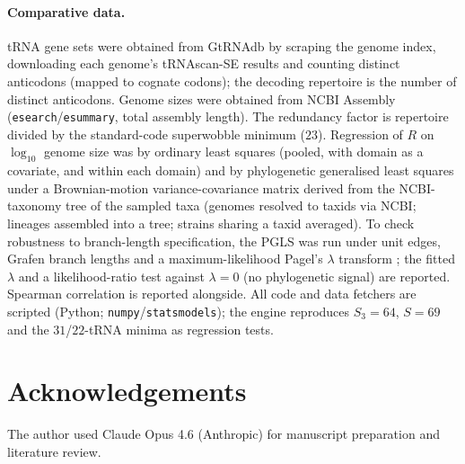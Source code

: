 \documentclass[11pt]{article}
\theoremstyle{remark}
\newcommand{\Sthree}{S_3}
\begin{document}
\paragraph{Comparative data.} tRNA gene sets were obtained from GtRNAdb by
scraping the genome index, downloading each genome's tRNAscan-SE results and
counting distinct anticodons (mapped to cognate codons); the decoding repertoire
is the number of distinct anticodons. Genome sizes were obtained from NCBI
Assembly (\texttt{esearch}/\texttt{esummary}, total assembly length). The
redundancy factor is repertoire divided by the standard-code superwobble minimum
($23$). Regression of $R$ on $\log_{10}$ genome size was by ordinary least
squares (pooled, with domain as a covariate, and within each domain) and by
phylogenetic generalised least squares under a Brownian-motion variance-covariance
matrix derived from the NCBI-taxonomy tree of the sampled taxa (genomes resolved
to taxids via NCBI; lineages assembled into a tree; strains sharing a taxid
averaged). To check robustness to branch-length specification, the PGLS was run
under unit edges, Grafen \cite{grafen89} branch lengths and a maximum-likelihood
Pagel's $\lambda$ transform \cite{pagel99}; the fitted $\lambda$ and a
likelihood-ratio test against $\lambda=0$ (no phylogenetic signal) are reported.
Spearman correlation is reported alongside. All code and data fetchers
are scripted (Python; \texttt{numpy}/\texttt{statsmodels}); the engine
reproduces $\Sthree=64$, $S=69$ and the $31$/$22$-tRNA minima as regression
tests.

\section*{Acknowledgements}

The author used Claude Opus 4.6 (Anthropic) for manuscript preparation and
literature review.
\end{document}
